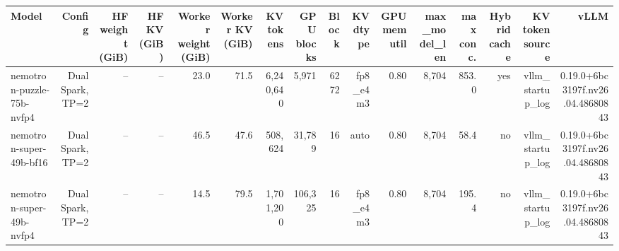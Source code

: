 \begin{tabular}{l r r r r r r r r r r r r r r r }
\toprule
Model & Config & HF weight (GiB) & HF KV (GiB) & Worker weight (GiB) & Worker KV (GiB) & KV tokens & GPU blocks & Block & KV dtype & GPU mem util & max\_model\_len & max conc. & Hybrid cache & KV token source & vLLM \\
\midrule
nemotron-puzzle-75b-nvfp4 & Dual Spark, TP=2 & -- & -- & 23.0 & 71.5 & 6,240,640 & 5,971 & 6272 & fp8\_e4m3 & 0.80 & 8,704 & 853.0 & yes & vllm\_startup\_log & 0.19.0+6bc3197f.nv26.04.48680843 \\
nemotron-super-49b-bf16 & Dual Spark, TP=2 & -- & -- & 46.5 & 47.6 & 508,624 & 31,789 & 16 & auto & 0.80 & 8,704 & 58.4 & no & vllm\_startup\_log & 0.19.0+6bc3197f.nv26.04.48680843 \\
nemotron-super-49b-nvfp4 & Dual Spark, TP=2 & -- & -- & 14.5 & 79.5 & 1,701,200 & 106,325 & 16 & fp8\_e4m3 & 0.80 & 8,704 & 195.4 & no & vllm\_startup\_log & 0.19.0+6bc3197f.nv26.04.48680843 \\
\bottomrule
\end{tabular}
